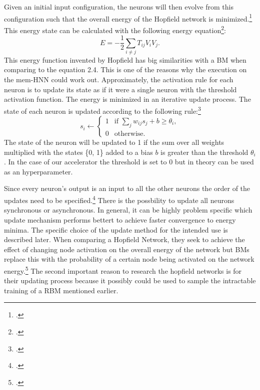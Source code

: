 Given an initial input configuration, the neurons will then evolve from this configuration such that the overall energy of the Hopfield network is minimized.\footcite[cf.][7]{ahadNeuralNetworksWireless2016}
This energy state can be calculated with the following energy equation\footcite[cf.][2556]{hopfieldNeuralNetworksPhysical1982}: 
\begin{equation}
    E = -\frac{1}{2} \sum_{i \neq j} T_{ij} V_i V_j .
\end{equation}
This energy function invented by Hopfield has big similarities with a \ac{BM} when comparing to the
equation 2.4. This is one of the reasons why the execution on the \ac{mem-HNN} could work out.
Approximately, the activation rule for each neuron is to update its state as if it were a single neuron with the threshold activation function.
The energy is minimized in an iterative update process.
The state of each neuron is updated according to the following rule:\footcite[cf.][506]{mackayInformationTheoryInference2003}
\begin{equation}
    s_i \leftarrow 
    \begin{cases} 
    1 & \text{if } \sum_j w_{ij} s_j + b \geq \theta_i, \\
    0 & \text{otherwise}.
    \end{cases}
    \label{eq:update_rule}
\end{equation}
    The state of the neuron will be updated to 1 if the sum over all weights multiplied with the states \{0, 1\} added to a bias \( b \)  is greater than the threshold \( \theta_i \).
In the case of our accelerator the threshold is set to 0 but in theory can be used as an hyperparameter.

Since every neuron's output is an input to all the other neurons the order of the updates need to be specified.\footcite[cf.][506]{mackayInformationTheoryInference2003}
There is the possbility to update all neurons synchronous or asynchronous. 
In general, it can be highly problem specific which update mechanism performs bettert to achieve faster convergence to energy minima.
The specific choice of the update method for the intended use is described later.
When comparing a Hopfield Network, they seek to achieve the effect of changing node activation on the overall energy of the network but \ac{BM}s replace this with the probability of a certain node being activated on the network energy.\footcite[cf.][7]{ahadNeuralNetworksWireless2016}
The second important reason to research the hopfield networks is for their updating process because it possibly could be used to sample the intractable training of a \ac{RBM} mentioned earlier.

